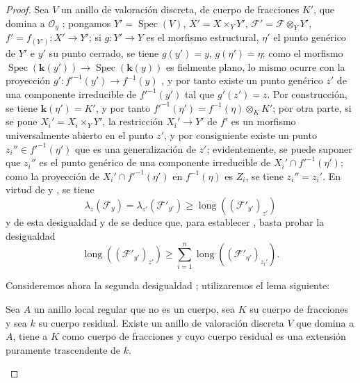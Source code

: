 \begin{proof}
Sea $V$ un anillo de valoración discreta, de cuerpo de fracciones $K'$, que domina a $\mathcal O_y$ ; pongamos $Y'=\operatorname{Spec}(V)$, $X'=X\times_Y Y'$, $\mathcal F'=\mathcal F\otimes_Y Y'$, $f'=f_{(Y')}:X'\to Y'$; si $g:Y'\to Y$ es el morfismo estructural, $\eta'$ el punto genérico de $Y'$ e $y'$ su punto cerrado, se tiene $g(y')=y$, $g(\eta')=\eta$; como el morfismo $\operatorname{Spec}(\boldsymbol{k}(y'))\to
\operatorname{Spec}(\boldsymbol{k}(y))$ es fielmente plano, lo mismo ocurre con la proyección $g':f'^{-1}(y')\to f^{-1}(y)$ , y por tanto  existe un punto genérico $z'$ de una componente irreducible de $f'^{-1}(y')$ tal que $g'(z')=z$.
Por construcción, se tiene $\boldsymbol{k}(\eta')=K'$, y por tanto $f'^{-1}(\eta')=f^{-1}(\eta)\otimes_K K'$; por otra parte, si se pone $X_i'=X_i\times_Y Y'$, la restricción $X_i'\to Y'$ de $f'$ es un morfismo universalmente abierto en el punto $z'$, y por consiguiente  existe un punto $z_i''\in f'^{-1}(\eta')$ que es una generalización de $z'$; evidentemente, se puede suponer que $z_i''$ es el punto genérico de una componente irreducible de $X_i'\cap f'^{-1}(\eta')$; como la proyección de $X_i'\cap f'^{-1}(\eta')$ en $f^{-1}(\eta)$ es $Z_i$, se tiene $z_i''=z_i'$.
En virtud de  y , se tiene
\[
\tag{15.1.1.4}
\label{IV.15.1.1.4-fr}
  \lambda_z(\mathcal F_y)=\lambda_{z'}(\mathcal F'_{y'})
  \geqslant\operatorname{long}((\mathcal F'_{y'})_{z'})
\]
y de esta desigualdad y de  se deduce que, para establecer , basta probar la desigualdad
\[
\tag{15.1.1.5}
\label{IV.15.1.1.5-fr}
  \operatorname{long}((\mathcal F'_{y'})_{z'})\geqslant
  \sum_{i=1}^{n}\operatorname{long}((\mathcal F'_{\eta'})_{z_i'}).
\]

Consideremos ahora la segunda desigualdad ; utilizaremos el lema siguiente:

\begin{lemma}[15.1.1.6]
\label{IV.15.1.1.6}
Sea $A$ un anillo local regular que no es un cuerpo, sea $K$ su cuerpo de fracciones y sea $k$ su cuerpo residual.
Existe un anillo de valoración discreta $V$ que domina a $A$, tiene a $K$ como cuerpo de fracciones y cuyo cuerpo residual es una extensión puramente trascendente de $k$.
\end{lemma}



\end{proof}
